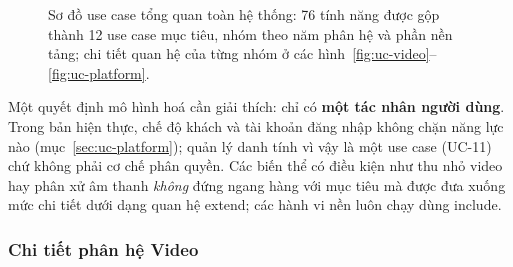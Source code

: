 \begin{figure}[H]
\caption{Sơ đồ use case tổng quan toàn hệ thống: 76 tính năng được gộp thành 12 use case mục tiêu, nhóm theo năm phân hệ và phần nền tảng; chi tiết quan hệ của từng nhóm ở các hình~\ref{fig:uc-video}--\ref{fig:uc-platform}.}
\label{fig:usecase}
\end{figure}

Một quyết định mô hình hoá cần giải thích: chỉ có \textbf{một tác nhân người dùng}. Trong bản hiện thực, chế độ khách và tài khoản đăng nhập không chặn năng lực nào (mục~\ref{sec:uc-platform}); quản lý danh tính vì vậy là một use case (UC-11) chứ không phải cơ chế phân quyền. Các biến thể có điều kiện như thu nhỏ video hay phân xử âm thanh \emph{không} đứng ngang hàng với mục tiêu mà được đưa xuống mức chi tiết dưới dạng quan hệ \guillemotleft extend\guillemotright; các hành vi nền luôn chạy dùng \guillemotleft include\guillemotright.

\subsubsection{Chi tiết phân hệ Video}
\label{sec:uc-video}

